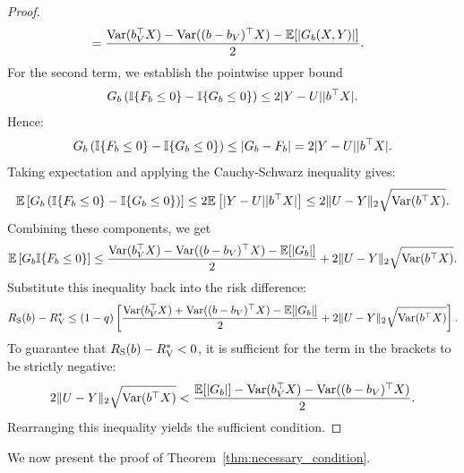 \begin{proof}
\begin{align}
    &= \frac{\mathrm{Var}(b_V^\top X) - \mathrm{Var}((b - b_V)^\top X) - \mathbb{E}[|G_b(X,Y)|]}{2}.
\end{align}
For the second term, we establish the pointwise upper bound 
\begin{equation*}
    G_b \left( \mathbb{I}\{F_b \le 0\} - \mathbb{I}\{G_b \le 0\} \right) \le 2|Y - U||b^\top X|.
\end{equation*}
Hence:
\begin{equation*}
    G_b \left( \mathbb{I}\{F_b \le 0\} - \mathbb{I}\{G_b \le 0\} \right) \le |G_b - F_b| = 2|Y - U||b^\top X|.
\end{equation*}
Taking expectation and applying the Cauchy-Schwarz inequality gives:
\begin{equation*}
    \mathbb{E}\left[ G_b \left( \mathbb{I}\{F_b \le 0\} - \mathbb{I}\{G_b \le 0\} \right) \right] \le 2\mathbb{E}\left[ |Y - U||b^\top X| \right] \le 2 \|U - Y\|_2 \sqrt{\mathrm{Var}(b^\top X)}.
\end{equation*}
Combining these components, we get
\begin{equation*}
    \mathbb{E}\left[ G_b \mathbb{I}\{F_b \le 0\} \right] \le \frac{\mathrm{Var}(b_V^\top X) - \mathrm{Var}((b - b_V)^\top X) - \mathbb{E}[|G_b|]}{2} + 2 \|U - Y\|_2 \sqrt{\mathrm{Var}(b^\top X)}.
\end{equation*}
Substitute this inequality back into the risk difference:
\begin{equation*}
    R_{\mathrm{S}}(b) - R_{\mathrm{V}}^* \le (1 - q) \left[ \frac{\mathrm{Var}(b_V^\top X) + \mathrm{Var}((b - b_V)^\top X) - \mathbb{E}[|G_b|]}{2} + 2\|U - Y\|_2 \sqrt{\mathrm{Var}(b^\top X)} \right].
\end{equation*}
To guarantee that $R_{\mathrm{S}}(b) - R_{\mathrm{V}}^* < 0$, it is sufficient for the term in the brackets to be strictly negative:
\begin{equation*}
    2\|U - Y\|_2 \sqrt{\mathrm{Var}(b^\top X)} < \frac{\mathbb{E}[|G_b|] - \mathrm{Var}(b_V^\top X) - \mathrm{Var}((b - b_V)^\top X)}{2}.
\end{equation*}
Rearranging this inequality yields the sufficient condition.
\end{proof}

We now present the proof of Theorem~\ref{thm:necessary_condition}.

